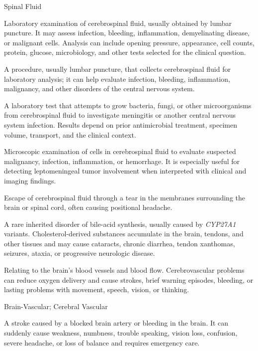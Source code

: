 \synonyms
Spinal Fluid

 Laboratory examination of cerebrospinal fluid, usually obtained by lumbar puncture. It may
assess infection, bleeding, inflammation, demyelinating disease, or malignant cells.
Analysis can include opening pressure, appearance, cell counts, protein, glucose,
microbiology, and other tests selected for the clinical question.

 A procedure, usually lumbar puncture, that collects cerebrospinal fluid for laboratory analysis; it can help evaluate infection, bleeding, inflammation, malignancy, and other disorders of the central nervous system.

 A laboratory test that attempts to grow bacteria, fungi, or other microorganisms from cerebrospinal fluid to investigate meningitis or another central nervous system infection. Results depend on prior antimicrobial treatment, specimen volume, transport, and the clinical context.

 Microscopic examination of cells in cerebrospinal fluid to evaluate suspected malignancy, infection, inflammation, or hemorrhage. It is especially useful for detecting leptomeningeal tumor involvement when interpreted with clinical and imaging findings.

 Escape of cerebrospinal fluid through a tear in the membranes surrounding the brain or spinal cord, often causing positional headache.

 A rare inherited disorder of bile-acid synthesis, usually caused by \textit{CYP27A1} variants. Cholesterol-derived substances accumulate in the brain, tendons, and other tissues and may cause cataracts, chronic diarrhea, tendon xanthomas, seizures, ataxia, or progressive neurologic disease.

 Relating to the brain's blood vessels and blood flow. Cerebrovascular problems can reduce oxygen delivery and cause strokes, brief warning episodes, bleeding, or lasting problems with movement, speech, vision, or thinking.

\synonyms
Brain-Vascular; Cerebral Vascular

 A stroke caused by a blocked brain artery or bleeding in the brain. It can suddenly cause weakness, numbness, trouble speaking, vision loss, confusion, severe headache, or loss of balance and requires emergency care.

